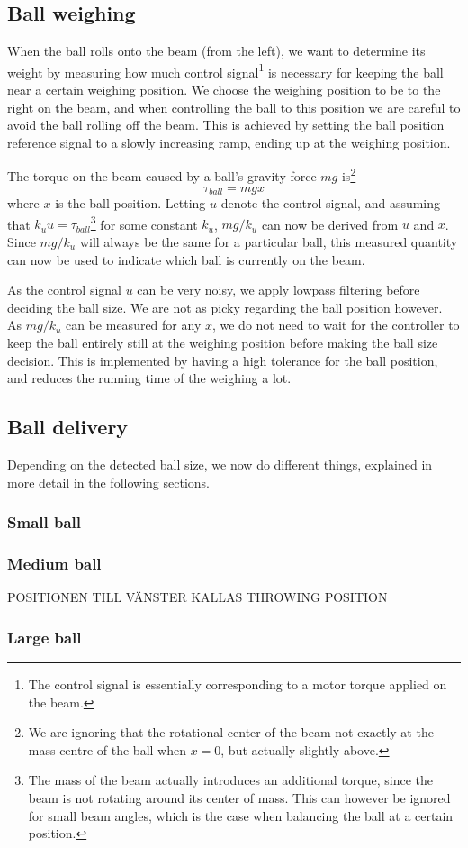 \subsection{Ball weighing}\label{sec:ball_weighing}
When the ball rolls onto the beam (from the left), we want to determine its weight by measuring how much control signal\footnote{The control signal is essentially corresponding to a motor torque applied on the beam.} is necessary for keeping the ball near a certain weighing position.
We choose the weighing position to be to the right on the beam, and when controlling the ball to this position we are careful to avoid the ball rolling off the beam.
This is achieved by setting the ball position reference signal to a slowly increasing ramp, ending up at the weighing position.

The torque on the beam caused by a ball's gravity force $mg$ is\footnote{We are ignoring that the rotational center of the beam not exactly at the mass centre of the ball when $x=0$, but actually slightly above.}
\[
\tau_{ball} = mgx
\]
where $x$ is the ball position. Letting $u$ denote the control signal, and assuming that $k_u u = \tau_{ball}$\footnote{The mass of the beam actually introduces an additional torque, since the beam is not rotating around its center of mass.
This can however be ignored for small beam angles, which is the case when balancing the ball at a certain position.} for some constant $k_u$, $mg/k_u$ can now be derived from $u$ and $x$.
Since $mg/k_u$ will always be the same for a particular ball, this measured quantity can now be used to indicate which ball is currently on the beam.

As the control signal $u$ can be very noisy, we apply lowpass filtering before deciding the ball size.
We are not as picky regarding the ball position however.
As $mg/k_u$ can be measured for any $x$, we do not need to wait for the controller to keep the ball entirely still at the weighing position before making the ball size decision.
This is implemented by having a high tolerance for the ball position, and reduces the running time of the weighing a lot.

\subsection{Ball delivery}\label{sec:ball_delivery}
Depending on the detected ball size, we now do different things, explained in more detail in the following sections.

\subsubsection{Small ball}\label{sec:small_ball_delivery}

\subsubsection{Medium ball}\label{sec:medium_ball_delivery}
POSITIONEN TILL VÄNSTER KALLAS THROWING POSITION \\

\subsubsection{Large ball}\label{sec:large_ball_delivery}


